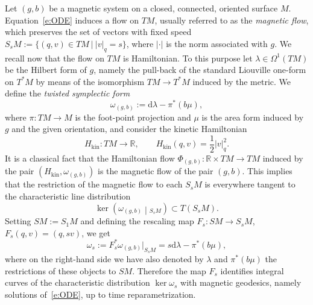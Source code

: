\documentclass[AHL,Unicode,longabstracts,published]{cedram}
\newcommand{\R}{\mathbb{R}}
\newcommand{\diff}{\mathrm{d}}
\newcommand{\kin}{{\mathrm{kin}}}
\begin{document}
Let $(g,b)$ be a magnetic system on a closed, connected, oriented surface $M$. Equation~\eqref{e:ODE} induces a flow on $TM$, usually referred to as the \emph{magnetic flow}, which preserves the set of vectors with fixed speed $S_s M := \{(q,v)\in TM\ |\ |v|_q=s\}$, where $|\cdot|$ is the norm associated with $g$. We recall now that the flow on $TM$ is Hamiltonian. To this purpose let $\lambda\in \Omega^1(TM)$ be the Hilbert form of $g$, namely the pull-back of the standard Liouville one-form on $T^*M$ by means of the isomorphism $TM\to T^*M$ induced by the metric. We define the \emph{twisted symplectic form}
\[
\omega_{(g,b)} := \diff \lambda - \pi^*(b\mu),
\]
where $\pi:TM\to M$ is the foot-point projection and $\mu$ is the area form induced by $g$ and the given orientation, and consider the kinetic Hamiltonian
\[
H_\kin :TM \to \R,\qquad H_{\kin}(q,v) = \frac{1}{2}|v|^2_q.
\]
It is a classical fact that the Hamiltonian flow $\Phi_{(g,b)}:\R\times TM\to TM$ induced by the pair $(H_\kin,\omega_{(g,b)})$ is the magnetic flow of the pair $(g,b)$. This implies that the restriction of the magnetic flow to each $S_s M$ is everywhere tangent to the characteristic line distribution
\[
\ker \left(\omega_{(g,b)}\middle|_{S_s M}\right)\subset T \left(S_s M\right).
\]
Setting $SM:=S_1M$ and defining the rescaling map $F_s:SM\to S_sM$, $F_s(q,v)=(q,sv)$, we get
\[
\omega_s:=F_s^*\omega_{(g,b)}\big|_{S_sM}=s\diff\lambda-\pi^*(b\mu),
\]
where on the right-hand side we have also denoted by $\lambda$ and $\pi^*(b\mu)$ the restrictions of these objects to $SM$. Therefore the map $F_s$ identifies integral curves of the characteristic distribution $\ker\omega_s$ with magnetic geodesics, namely solutions of~\eqref{e:ODE}, up to time reparametrization.
\end{document}
